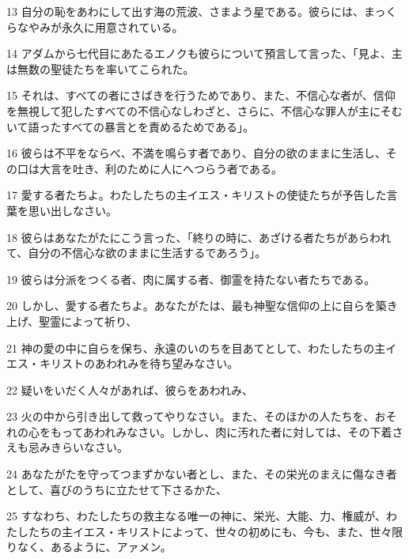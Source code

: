 \par 13 自分の恥をあわにして出す海の荒波、さまよう星である。彼らには、まっくらなやみが永久に用意されている。
\par 14 アダムから七代目にあたるエノクも彼らについて預言して言った、「見よ、主は無数の聖徒たちを率いてこられた。
\par 15 それは、すべての者にさばきを行うためであり、また、不信心な者が、信仰を無視して犯したすべての不信心なしわざと、さらに、不信心な罪人が主にそむいて語ったすべての暴言とを責めるためである」。
\par 16 彼らは不平をならべ、不満を鳴らす者であり、自分の欲のままに生活し、その口は大言を吐き、利のために人にへつらう者である。
\par 17 愛する者たちよ。わたしたちの主イエス・キリストの使徒たちが予告した言葉を思い出しなさい。
\par 18 彼らはあなたがたにこう言った、「終りの時に、あざける者たちがあらわれて、自分の不信心な欲のままに生活するであろう」。
\par 19 彼らは分派をつくる者、肉に属する者、御霊を持たない者たちである。
\par 20 しかし、愛する者たちよ。あなたがたは、最も神聖な信仰の上に自らを築き上げ、聖霊によって祈り、
\par 21 神の愛の中に自らを保ち、永遠のいのちを目あてとして、わたしたちの主イエス・キリストのあわれみを待ち望みなさい。
\par 22 疑いをいだく人々があれば、彼らをあわれみ、
\par 23 火の中から引き出して救ってやりなさい。また、そのほかの人たちを、おそれの心をもってあわれみなさい。しかし、肉に汚れた者に対しては、その下着さえも忌みきらいなさい。
\par 24 あなたがたを守ってつまずかない者とし、また、その栄光のまえに傷なき者として、喜びのうちに立たせて下さるかた、
\par 25 すなわち、わたしたちの救主なる唯一の神に、栄光、大能、力、権威が、わたしたちの主イエス・キリストによって、世々の初めにも、今も、また、世々限りなく、あるように、アァメン。


